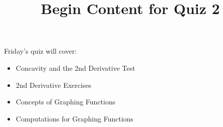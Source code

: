 \documentclass{ximera}
\title{Begin Content for Quiz 2}
\begin{document}
\begin{abstract}
\end{abstract}

\maketitle

\begin{sectionOutcomes}

Friday's quiz will cover:



\begin{itemize}
\item Concavity and the 2nd Derivative Test
\item 2nd Derivative Exercises
\item Concepts of  Graphing Functions
\item Computations for Graphing Functions
\end{itemize}

\end{sectionOutcomes}
\end{document}

